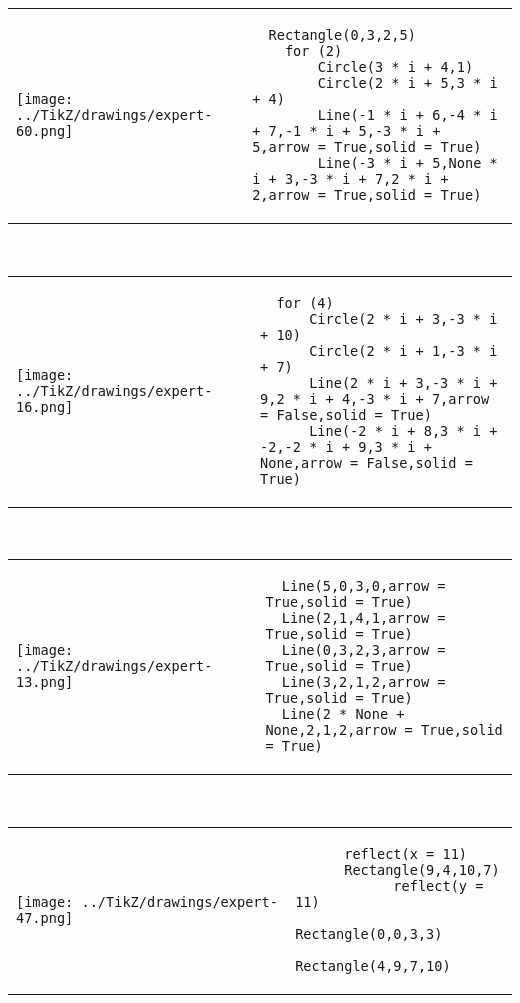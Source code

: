         \begin{tabular}{ll}
\texttt{[image: ../TikZ/drawings/expert-60.png]}&
        \begin{minipage}{10cm}
        \begin{verbatim}
  Rectangle(0,3,2,5)
    for (2)
        Circle(3 * i + 4,1)
        Circle(2 * i + 5,3 * i + 4)
        Line(-1 * i + 6,-4 * i + 7,-1 * i + 5,-3 * i + 5,arrow = True,solid = True)
        Line(-3 * i + 5,None * i + 3,-3 * i + 7,2 * i + 2,arrow = True,solid = True)
        \end{verbatim}
\end{minipage}
\end{tabular}        
        \\

        \begin{tabular}{ll}
\texttt{[image: ../TikZ/drawings/expert-16.png]}&
        \begin{minipage}{10cm}
        \begin{verbatim}
  for (4)
      Circle(2 * i + 3,-3 * i + 10)
      Circle(2 * i + 1,-3 * i + 7)
      Line(2 * i + 3,-3 * i + 9,2 * i + 4,-3 * i + 7,arrow = False,solid = True)
      Line(-2 * i + 8,3 * i + -2,-2 * i + 9,3 * i + None,arrow = False,solid = True)
        \end{verbatim}
\end{minipage}
\end{tabular}        
        \\

        \begin{tabular}{ll}
\texttt{[image: ../TikZ/drawings/expert-13.png]}&
        \begin{minipage}{10cm}
        \begin{verbatim}
  Line(5,0,3,0,arrow = True,solid = True)
  Line(2,1,4,1,arrow = True,solid = True)
  Line(0,3,2,3,arrow = True,solid = True)
  Line(3,2,1,2,arrow = True,solid = True)
  Line(2 * None + None,2,1,2,arrow = True,solid = True)
        \end{verbatim}
\end{minipage}
\end{tabular}        
        \\

        \begin{tabular}{ll}
\texttt{[image: ../TikZ/drawings/expert-47.png]}&
        \begin{minipage}{10cm}
        \begin{verbatim}
      reflect(x = 11)
      Rectangle(9,4,10,7)
            reflect(y = 11)
            Rectangle(0,0,3,3)
            Rectangle(4,9,7,10)
        \end{verbatim}
\end{minipage}
\end{tabular}        
        \\

